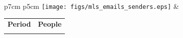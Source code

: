 \documentclass[a4wide,11pt]{report}
\begin{document}
\begin{tabular}{p{7cm} p{5cm}}
    \vspace{0pt} 
    \texttt{[image: figs/mls\_emails\_senders.eps]}
    & 
    \vspace{0pt}
    \begin{tabular}{l|l}%
    \bfseries Period & \bfseries People %
    \csvreader[head to column names]{data/mls_emails_senders.csv}{}%
    {\\ & \emailssenders}
    \end{tabular}
\end{tabular}



\end{document}
